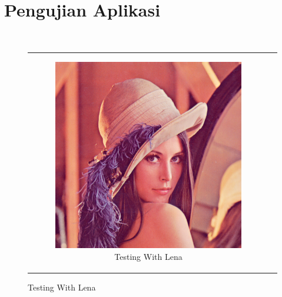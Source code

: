  


\section{Pengujian Aplikasi}
\blindtext \\

\begin{figure}
	\centering
	\begin{tabular}[c]{cc}
		
		\begin{subfigure}[t]{0.45\textwidth}
			\includegraphics[width=\linewidth]{pics/lena.png}
			\caption{Testing With Lena} \label{fig:4a}
		\end{subfigure}
		\hspace*{\fill} %
		

\end{tabular}
\end{figure}
